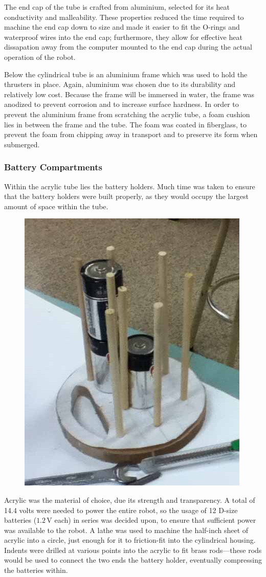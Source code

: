 \documentclass[12pt, letterpaper, twocolumn, titlepage]{article}
\begin{document}
The end cap of the tube is crafted from aluminium, selected for its heat conductivity and malleability. These properties reduced the time required to machine the end cap down to size and made it easier to fit the O-rings and waterproof wires into the end cap; furthermore, they allow for effective heat dissapation away from the computer mounted to the end cap during the actual operation of the robot.

Below the cylindrical tube is an aluminium frame which was used to hold the thrusters in place. Again, aluminium was chosen due to its durability and relatively low cost. Because the frame will be immersed in water, the frame was anodized to prevent corrosion and to increase surface hardness. In order to prevent the aluminium frame from scratching the acrylic tube, a foam cushion lies in between the frame and the tube. The foam was coated in fiberglass, to prevent the foam from chipping away in transport and to preserve its form when submerged.

\subsubsection{Battery Compartments}

Within the acrylic tube lies the battery holders. Much time was taken to ensure that the battery holders were built properly, as they would occupy the largest amount of space within the tube.

\begin{figure}
	\vspace{-30pt}
 	\flushright
   	\includegraphics[width=0.38\columnwidth]{Battery}
   	\vspace{-30pt}
\end{figure}

Acrylic was the material of choice, due its strength and transparency. A total of 14.4 volts were needed to power the entire robot, so the usage of 12 D-size batteries ($1.2$\,V each) in series was decided upon, to ensure that sufficient power was available to the robot. A lathe was used to machine the half-inch sheet of acrylic into a circle, just enough for it to friction-fit into the cylindrical housing. Indents were drilled at various points into the acrylic to fit brass rods---these rods would be used to connect the two ends the battery holder, eventually compressing the batteries within.
\end{document}
